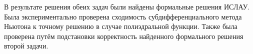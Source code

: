 В результате решения обеих задач были найдены формальные решения ИСЛАУ. Была экспериментально проверена сходимость субдифференциального метода Ньютона к точному решению в случае полиэдральной функции. Также была проверена путём подстановки корректность найденного формального решения второй задачи.